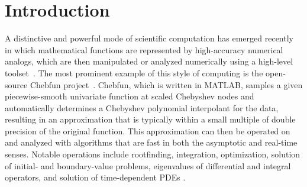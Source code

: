 \chapter{Introduction}
\label{intro}

A distinctive and powerful mode of scientific computation has emerged recently in which mathematical functions are represented by high-accuracy numerical analogs, which are then manipulated or analyzed numerically using a high-level toolset~\cite{Trefethen2015}. The most prominent example of this style of computing is the open-source Chebfun project~\cite{battles2004extension,Driscoll2014}. Chebfun, which is written in MATLAB, samples a given piecewise-smooth univariate function at scaled Chebyshev nodes and automatically determines a Chebyshev polynomial interpolant for the data, resulting in an approximation that is typically within a small multiple of double precision of the original function. This approximation can then be operated on and analyzed with algorithms that are fast in both the asymptotic and real-time senses. Notable operations include rootfinding, integration, optimization, solution of initial- and boundary-value problems, eigenvalues of differential and integral operators, and solution of time-dependent PDEs \cite{hale2012chebfun,platte2010chebfun,battles2005numerical}.

